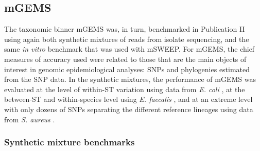 \documentclass[officiallayout]{tktla}
\begin{document}
\subsection{mGEMS}
\label{mgems-performance-benchmark}

The taxonomic binner mGEMS was, in turn, benchmarked in Publication II
using again both synthetic mixtures of reads from isolate sequencing,
and the same \textit{in vitro} benchmark that was used with
mSWEEP. For mGEMS, the chief measures of accuracy used were related to
those that are the main objects of interest in genomic epidemiological
analyses: SNPs and phylogenies estimated from the SNP data. In the
synthetic mixtures, the performance of mGEMS was evaluated at the
level of within-ST variation using data from \textit{E. coli}
\citep{brodrick2017longitudinal}, at the between-ST and within-species
level using \textit{E. faecalis} \citep{raven2016genome}, and at an
extreme level with only dozens of SNPs separating the different
reference lineages using data from \textit{S. aureus}
\citep{paterson2015capturing}.

\subsubsection{Synthetic mixture benchmarks}
\end{document}
